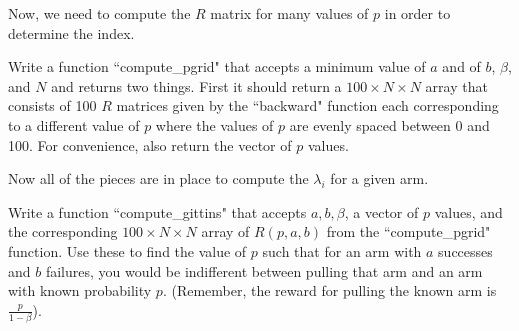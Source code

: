 Now, we need to compute the $R$ matrix for many values of $p$ in order to determine the index.

\begin{problem}
Write a function ``compute\_pgrid" that accepts a minimum value of $a$ and of $b$, $\beta$, and $N$ and returns two things.  First it should return a $100\times N\times N$ array that consists of 100 $R$ matrices given by the ``backward" function each corresponding to a different value of $p$ where the values of $p$ are evenly spaced between 0 and 100.  For convenience, also return the vector of $p$ values.
\end{problem}

Now all of the pieces are in place to compute the $\lambda_i$ for a given arm.

\begin{problem}
Write a function ``compute\_gittins" that accepts $a,b,\beta$, a vector of $p$ values, and the corresponding $100\times N\times N$ array of $R(p,a,b)$ from the ``compute\_pgrid" function.  Use these to find the value of $p$ such that for an arm with $a$ successes and $b$ failures, you would be indifferent between pulling that arm and an arm with known probability $p$.  (Remember, the reward for pulling the known arm is $\frac{p}{1-\beta}$).
\end{problem}